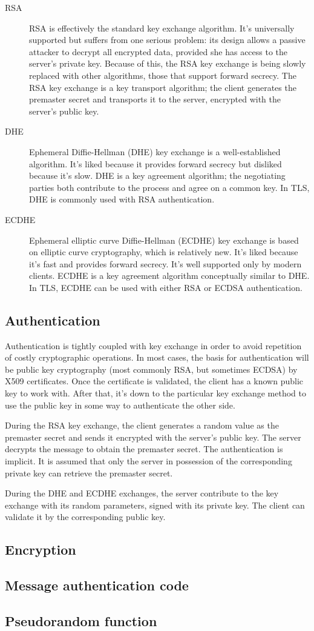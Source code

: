 \begin{description}
  \item[RSA] RSA is effectively the standard key exchange algorithm. It's universally supported but suffers from one serious problem: its design allows a passive attacker to decrypt all encrypted data, provided she has access to the server's private key. Because of this, the RSA key exchange is being slowly replaced with other algorithms, those that support forward secrecy. The RSA key exchange is a key transport algorithm; the client generates the premaster secret and transports it to the server, encrypted with the server's
public key.
  \item[DHE] Ephemeral Diffie-Hellman (DHE) key exchange is a well-established algorithm. It's liked because it provides forward secrecy but disliked because it's slow. DHE is a key agreement algorithm; the negotiating parties both contribute to the process and agree
on a common key. In TLS, DHE is commonly used with RSA authentication.
  \item[ECDHE] Ephemeral elliptic curve Diffie-Hellman (ECDHE) key exchange is based on elliptic curve cryptography, which is relatively new. It's liked because it's fast and provides forward secrecy. It's well supported only by modern clients. ECDHE is a key agreement algorithm conceptually similar to DHE. In TLS, ECDHE can be used with either RSA or ECDSA authentication. \cite{ristic2014bulletproof}
\end{description}

\subsection{Authentication}

Authentication is tightly coupled with key exchange in order to avoid repetition of costly cryptographic operations. In most cases, the basis for authentication will be public key cryptography (most commonly RSA, but sometimes ECDSA) by X509 certificates. Once the certificate is validated, the client has a known public key to work with. After that, it's down to the particular key exchange method to use the public key in some way to authenticate the other side.

During the RSA key exchange, the client generates a random value as the premaster secret and sends it encrypted with the server's public key. The server decrypts the message to obtain the premaster secret. The authentication is implicit. It is assumed that only the server in possession of the corresponding private key can retrieve the premaster secret.

During the DHE and ECDHE exchanges, the server contribute to the key exchange with its random parameters, signed with its private key. The client can validate it by the corresponding public key.

\subsection{Encryption}

\subsection{Message authentication code}

\subsection{Pseudorandom function}
